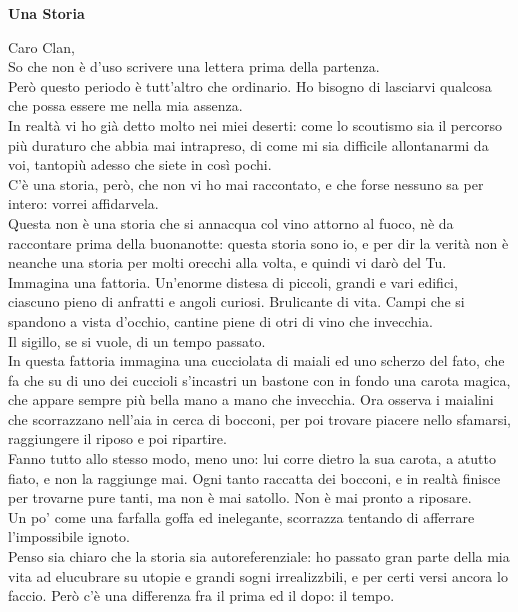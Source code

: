 \documentclass[17pt]{extletter}
\begin{document}
\hspace{4in}
\begin{center}
{\huge\bfseries
Una Storia}
\end{center}

Caro Clan,\\
So che non è d'uso scrivere una lettera prima della partenza.\\
Però questo periodo è tutt'altro che ordinario. Ho bisogno di lasciarvi qualcosa che possa essere me nella mia assenza.\\
In realtà vi ho già detto molto nei miei deserti: come lo scoutismo sia il percorso più duraturo che abbia mai intrapreso, di come mi sia difficile allontanarmi da voi, tantopiù adesso che siete in così pochi.\\
C'è una storia, però, che non vi ho mai raccontato, e che forse nessuno sa per intero: vorrei affidarvela.\\
Questa non è una storia che si annacqua col vino attorno al fuoco, nè da raccontare prima della buonanotte: questa storia sono io, e per dir la verità non è neanche una storia per molti orecchi alla volta, e quindi vi darò del Tu.\\
Immagina una fattoria. Un'enorme distesa di piccoli, grandi e vari edifici, ciascuno pieno di anfratti e angoli curiosi. Brulicante di vita. Campi che si spandono a vista d'occhio, cantine piene di otri di vino che invecchia.\\
Il sigillo, se si vuole, di un tempo passato.\\
In questa fattoria immagina una cucciolata di maiali ed uno scherzo del fato, che fa che su di uno dei cuccioli s'incastri un bastone con in fondo una carota magica, che appare sempre più bella mano a mano che invecchia. Ora osserva i maialini che scorrazzano nell'aia in cerca di bocconi, per poi trovare piacere nello sfamarsi, raggiungere il riposo e poi ripartire.\\
Fanno tutto allo stesso modo, meno uno: lui corre dietro la sua carota, a atutto fiato, e non la raggiunge mai. Ogni tanto raccatta dei bocconi, e in realtà finisce per trovarne pure tanti, ma non è mai satollo. Non è mai pronto a riposare.\\
Un po' come una farfalla goffa ed inelegante, scorrazza tentando di afferrare l'impossibile ignoto.\\
Penso sia chiaro che la storia sia autoreferenziale: ho passato gran parte della mia vita ad elucubrare su utopie e grandi sogni irrealizzbili, e per certi versi ancora lo faccio. Però c'è una differenza fra il prima ed il dopo: il tempo.\\
\end{document}
